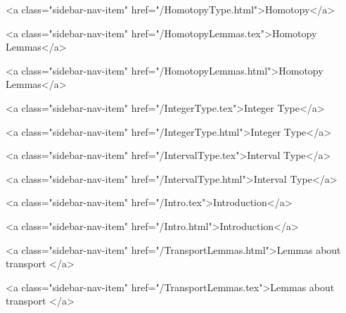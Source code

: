       
    
      
        
          <a class="sidebar-nav-item" href="/HomotopyType.html">Homotopy</a>
        
      
    
      
        
          <a class="sidebar-nav-item" href="/HomotopyLemmas.tex">Homotopy Lemmas</a>
        
      
    
      
        
          <a class="sidebar-nav-item" href="/HomotopyLemmas.html">Homotopy Lemmas</a>
        
      
    
      
        
          <a class="sidebar-nav-item" href="/IntegerType.tex">Integer Type</a>
        
      
    
      
        
          <a class="sidebar-nav-item" href="/IntegerType.html">Integer Type</a>
        
      
    
      
        
          <a class="sidebar-nav-item" href="/IntervalType.tex">Interval Type</a>
        
      
    
      
        
          <a class="sidebar-nav-item" href="/IntervalType.html">Interval Type</a>
        
      
    
      
        
          <a class="sidebar-nav-item" href="/Intro.tex">Introduction</a>
        
      
    
      
        
          <a class="sidebar-nav-item" href="/Intro.html">Introduction</a>
        
      
    
      
        
          <a class="sidebar-nav-item" href="/TransportLemmas.html">Lemmas about transport </a>
        
      
    
      
        
          <a class="sidebar-nav-item" href="/TransportLemmas.tex">Lemmas about transport </a>
        
